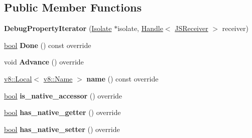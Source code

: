 \subsection*{Public Member Functions}
\begin{DoxyCompactItemize}
\item 
\mbox{\label{classv8_1_1internal_1_1DebugPropertyIterator_a427fe0b0fa06286ff29b9cf5da16c63d}} 
{\bfseries Debug\+Property\+Iterator} (\mbox{\hyperlink{classv8_1_1internal_1_1Isolate}{Isolate}} $\ast$isolate, \mbox{\hyperlink{classv8_1_1internal_1_1Handle}{Handle}}$<$ \mbox{\hyperlink{classv8_1_1internal_1_1JSReceiver}{J\+S\+Receiver}} $>$ receiver)
\item 
\mbox{\label{classv8_1_1internal_1_1DebugPropertyIterator_acada15723b2cfd9f946b369cfcc343cb}} 
\mbox{\hyperlink{classbool}{bool}} {\bfseries Done} () const override
\item 
\mbox{\label{classv8_1_1internal_1_1DebugPropertyIterator_ae4975cf278bcebf6070c0585e37652c2}} 
void {\bfseries Advance} () override
\item 
\mbox{\label{classv8_1_1internal_1_1DebugPropertyIterator_a75ce0ad0a49fec4e0a4dd2534f1eb6bd}} 
\mbox{\hyperlink{classv8_1_1Local}{v8\+::\+Local}}$<$ \mbox{\hyperlink{classv8_1_1Name}{v8\+::\+Name}} $>$ {\bfseries name} () const override
\item 
\mbox{\label{classv8_1_1internal_1_1DebugPropertyIterator_a5c2e766973077e24b16689a99c7b862f}} 
\mbox{\hyperlink{classbool}{bool}} {\bfseries is\+\_\+native\+\_\+accessor} () override
\item 
\mbox{\label{classv8_1_1internal_1_1DebugPropertyIterator_a982a521b16473b2241b9628325e19aa1}} 
\mbox{\hyperlink{classbool}{bool}} {\bfseries has\+\_\+native\+\_\+getter} () override
\item 
\mbox{\label{classv8_1_1internal_1_1DebugPropertyIterator_aa08386a97cf25a06bd663620f490115f}} 
\mbox{\hyperlink{classbool}{bool}} {\bfseries has\+\_\+native\+\_\+setter} () override

\end{DoxyCompactItemize}
